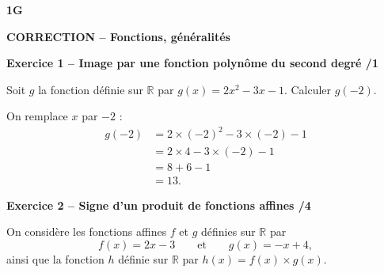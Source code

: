 \documentclass[10pt,a4paper]{article}
\renewcommand{\niveau}{1G}
\renewcommand{\chapitre}{Fonctions, généralités}
\renewcommand{\interroversion}[1]{
    \noindent\textbf{\niveau}

    \vspace{-0.5cm}
    \begin{center}
        \textbf{\large CORRECTION -- \chapitre}
    \end{center}

    \vspace{0.1cm}
}
\begin{document}

\interroversion{A}

\textbf{Exercice 1 -- Image par une fonction polynôme du second degré \hfill /1}

Soit \(g\) la fonction définie sur \(\mathbb{R}\) par \(g(x)=2x^2-3x-1\). Calculer \(g(-2)\).

On remplace \(x\) par \(-2\) :
\[
\begin{aligned}
g(-2) &= 2\times(-2)^2-3\times(-2)-1\\
      &= 2\times4-3\times(-2)-1\\
      &= 8+6-1\\
      &= 13.
\end{aligned}
\]

\textbf{Exercice 2 -- Signe d'un produit de fonctions affines \hfill /4}

On considère les fonctions affines \(f\) et \(g\) définies sur \(\mathbb{R}\) par
\[
f(x)=2x-3 \qquad\text{et}\qquad g(x)=-x+4,
\]
ainsi que la fonction \(h\) définie sur \(\mathbb{R}\) par \(h(x)=f(x)\times g(x)\).
\end{document}
